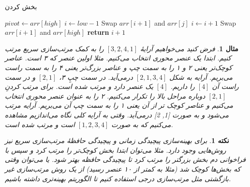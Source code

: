 \documentclass[12pt]{article}
\newtheorem{remark}{نکته}
\newtheorem{example}{مثال}
\begin{document}
\begin{algorithm}[H]
  \caption{بخش کردن}
  \label{alg:a6}
  \begin{latin}
    \begin{algorithmic}[1]
      \State $pivot \gets arr[high]$
      \State $i \gets low - 1$
      \State Swap $arr[i+1]$ and $arr[j]$
      \State $i \gets i + 1$
      \EndIf
      \EndFor
      \State Swap $arr[i+1]$ and $arr[high]$
      \State \textbf{return} $i+1$
      \EndProcedure
    \end{algorithmic}
  \end{latin}
\end{algorithm}

\begin{example}
  فرض کنید می‌خواهیم آرایهٔ $[3, 2, 4, 1]$
  را به کمک مرتب‌سازی سریع مرتب کنیم.
  ابتدا یک عنصر محوری انتخاب می‌کنیم.
  مثلا اولین عنصر که ۳ است.
  عناصر کوچک‌تر یعنی ۲ و ۱ را به سمت چپ و
  عناصر بزرگ‌تر یعنی ۴ را به سمت راست می‌بریم.
  آرایه به شکل
  $[2,1,3,4]$
  درمی‌آید.
  در سمت چپِ ۳،
  $[2, 1]$
  و در سمت راست آن $[4]$
  را داریم.
  $[4]$
  یک عنصر دارد و مرتب شده است.
  برای مرتب کردنِ
  $[2, 1]$
  دوباره مراحل بالا را تکرار می‌کنیم.
  ۲
  را به عنوان عنصر محوری انتخاب می‌کنیم و
  عناصر کوچک تر از آن یعنی ۱ را به سمت چپ آن می‌بریم.
  آرایه مرتب می‌شود و به صورت
  [1, 2]
  درمی‌آید.
  وقتی به آرایه کلی نگاه می‌اندازیم مشاهده می‌کنیم که به صورت
  $[1, 2, 3, 4]$
  است و مرتب شده است.
\end{example}

\begin{remark}
  برای بهینه‌سازی پیچیدگی زمانی و پیچیدگی حافظهٔ مرتب‌سازی سریع نیز روش‌هایی وجود دارد.
  مثلا می‌توان ابتدا بخش کوچک‌تر را مرتب کرد و سپس با فراخوانی دم
  بخش بزرگتر را مرتب کرد تا
  پیچیدگی حافظه بهتر شود.
  یا می‌توان وقتی که بخش‌ها کوچک شد
  (مثلا به کمتر از ۱۰ عنصر رسید)
  از یک روش مرتب‌سازی غیر بازگشتی
  مثل مرتب‌سازی درجی استفاده کنیم
  تا الگوریتم بهینه‌تری داشته باشیم.\cite{quick3}\cite{quick4}
\end{remark}

{
\fontsize{12pt}{10pt}\selectfont


}
\end{document}

